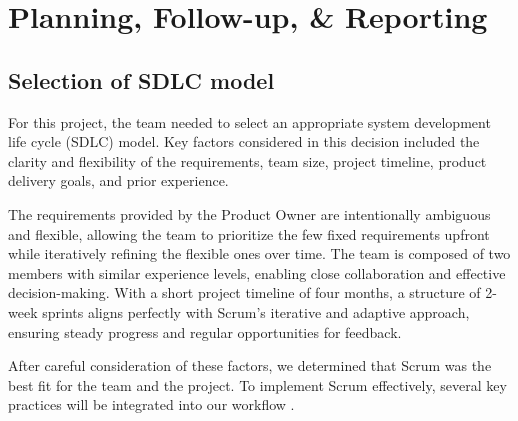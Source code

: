 \section{Planning, Follow-up, \& Reporting}
\subsection{Selection of SDLC model}

\begin{comment}
    Describe how the group will follow the chosen model
    
    Fire viktige forhold å ta hensyn til ved valg av utviklingmodell /
    prosessrammeverk :
    ▪ Universitetets krav til prosjektarbeidet/bacheloroppgaven
    ▪ Karakteristika ved oppgaven
    ▪ Motivasjonen og ferdighetene til deltagerne
    ▪ Ønsker og krav fra oppdragsgiver
    Velg modell – deretter bør dere tilpasse den / sette den opp til deres
    “setting”.


\end{comment}

For this project, the team needed to select an appropriate system development life cycle (SDLC) model. Key factors considered in this decision included the clarity and flexibility of the requirements, team size, project timeline, product delivery goals, and prior experience. 

The requirements provided by the Product Owner are intentionally ambiguous and flexible, allowing the team to prioritize the few fixed requirements upfront while iteratively refining the flexible ones over time. The team is composed of two members with similar experience levels, enabling close collaboration and effective decision-making. With a short project timeline of four months, a structure of 2-week sprints aligns perfectly with Scrum's iterative and adaptive approach, ensuring steady progress and regular opportunities for feedback. 

After careful consideration of these factors, we determined that Scrum was the best fit for the team and the project. To implement Scrum effectively, several key practices will be integrated into our workflow \cite{scrum_guide}.

